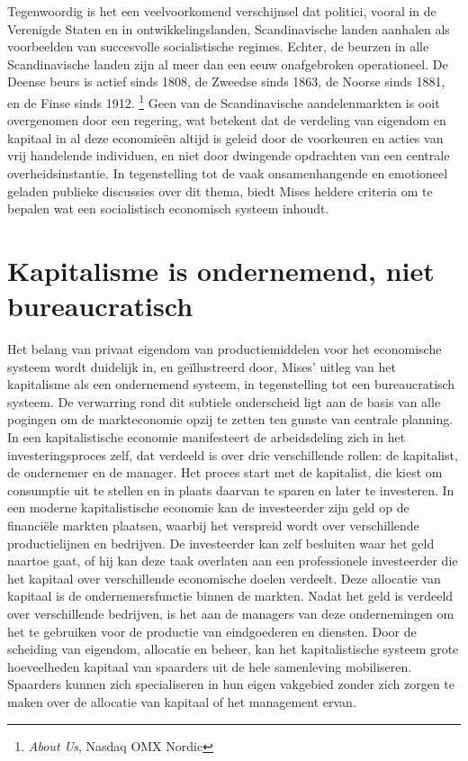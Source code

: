 \documentclass[
  a5paper,
  smalldemyvopaper,11pt,twoside,onecolumn,openright,extrafontsizes,
hidelinks]{memoir}
\begin{document}
Tegenwoordig is het een veelvoorkomend verschijnsel dat politici, vooral
in de Verenigde Staten en in ontwikkelingslanden, Scandinavische landen
aanhalen als voorbeelden van succesvolle socialistische regimes. Echter,
de beurzen in alle Scandinavische landen zijn al meer dan een eeuw
onafgebroken operationeel. De Deense beurs is actief sinds 1808, de
Zweedse sinds 1863, de Noorse sinds 1881, en de Finse sinds 1912.
\footnote{\emph{About Us}, Nasdaq OMX Nordic} Geen van de Scandinavische
aandelenmarkten is ooit overgenomen door een regering, wat betekent dat
de verdeling van eigendom en kapitaal in al deze economieën altijd is
geleid door de voorkeuren en acties van vrij handelende individuen, en
niet door dwingende opdrachten van een centrale overheidsinstantie. In
tegenstelling tot de vaak onsamenhangende en emotioneel geladen publieke
discussies over dit thema, biedt Mises heldere criteria om te bepalen
wat een socialistisch economisch systeem inhoudt.

\section{Kapitalisme is ondernemend, niet
bureaucratisch}\label{kapitalisme-is-ondernemend-niet-bureaucratisch}

Het belang van privaat eigendom van productiemiddelen voor het
economische systeem wordt duidelijk in, en geïllustreerd door, Mises'
uitleg van het kapitalisme als een ondernemend systeem, in tegenstelling
tot een bureaucratisch systeem. De verwarring rond dit subtiele
onderscheid ligt aan de basis van alle pogingen om de markteconomie
opzij te zetten ten gunste van centrale planning. In een kapitalistische
economie manifesteert de arbeidsdeling zich in het investeringsproces
zelf, dat verdeeld is over drie verschillende rollen: de kapitalist, de
ondernemer en de manager. Het proces start met de kapitalist, die kiest
om consumptie uit te stellen en in plaats daarvan te sparen en later te
investeren. In een moderne kapitalistische economie kan de investeerder
zijn geld op de financiële markten plaatsen, waarbij het verspreid wordt
over verschillende productielijnen en bedrijven. De investeerder kan
zelf besluiten waar het geld naartoe gaat, of hij kan deze taak
overlaten aan een professionele investeerder die het kapitaal over
verschillende economische doelen verdeelt. Deze allocatie van kapitaal
is de ondernemersfunctie binnen de markten. Nadat het geld is verdeeld
over verschillende bedrijven, is het aan de managers van deze
ondernemingen om het te gebruiken voor de productie van eindgoederen en
diensten. Door de scheiding van eigendom, allocatie en beheer, kan het
kapitalistische systeem grote hoeveelheden kapitaal van spaarders uit de
hele samenleving mobiliseren. Spaarders kunnen zich specialiseren in hun
eigen vakgebied zonder zich zorgen te maken over de allocatie van
kapitaal of het management ervan.
\end{document}
